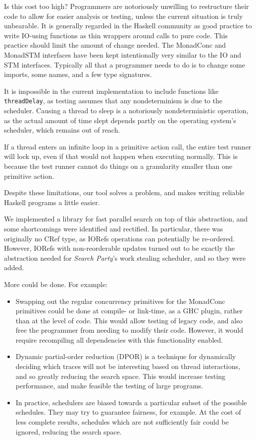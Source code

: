 Is this cost too high? Programmers are notoriously unwilling to
restructure their code to allow for easier analysis or testing, unless
the current situation is truly unbearable. It is generally regarded in
the Haskell community as good practice to write IO-using functions as
thin wrappers around calls to pure code. This practice should limit
the amount of change needed. The MonadConc and MonadSTM interfaces
have been kept intentionally very similar to the IO and STM
interfaces. Typically all that a programmer needs to do is to change
some imports, some names, and a few type signatures.

It is impossible in the current implementation to include functions
like \texttt{threadDelay}, as testing assumes that any nondeterminism
is due to the scheduler. Causing a thread to sleep is a notoriously
nondeterministic operation, as the actual amount of time slept depends
partly on the operating system's scheduler, which remains out of
reach.

If a thread enters an infinite loop in a primitive action call, the
entire test runner will lock up, even if that would not happen when
executing normally. This is because the test runner cannot do things
on a granularity smaller than one primitive action.

Despite these limitations, our tool solves a problem, and makes
writing reliable Haskell programs a little easier.

We implemented a library for fast parallel search on top of this
abstraction, and some shortcomings were identified and rectified. In
particular, there was originally no CRef type, as IORefs operations
can potentially be re-ordered\cite{ioref}. However, IORefs with
non-reorderable updates turned out to be exactly the abstraction
needed for \textit{Search Party}'s work stealing scheduler, and so
they were added.

More could be done. For example:

\begin{itemize}
  \item Swapping out the regular concurrency primitives for the
    MonadConc primitives could be done at compile- or link-time, as a
    GHC plugin, rather than at the level of code. This would allow
    testing of legacy code, and also free the programmer from needing
    to modify their code. However, it would require recompiling all
    dependencies with this functionality enabled.

  \item Dynamic partial-order reduction (DPOR)\cite{dpor} is a
    technique for dynamically deciding which traces will not be
    interesting based on thread interactions, and so greatly reducing
    the search space. This would increase testing performance, and
    make feasible the testing of large programs.

  \item In practice, schedulers are biased towards a particular subset
    of the possible schedules. They may try to guarantee fairness, for
    example. At the cost of less complete results, schedules which are
    not sufficiently fair could be ignored, reducing the search space.
\end{itemize}


